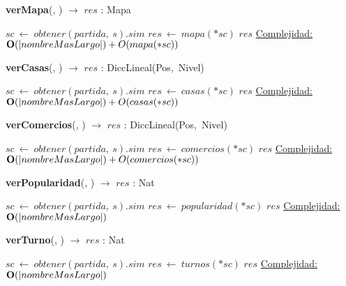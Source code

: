 \begin{Algoritmos}
    \begin{algorithm}[H]{\textbf{verMapa}(, ) $\to$ $res$ : Mapa}
    \begin{algorithmic}[1]
        \State $sc\ \leftarrow\ obtener(partida,\ s).sim$
        \State $res\ \leftarrow\ mapa(*sc)$ 
        \State \Return $res$
        \medskip
        \Statex \underline{Complejidad:} $\bold{O}(|nombreMasLargo|) + O(mapa(*sc))$
    \end{algorithmic}
    \end{algorithm}
      
    \begin{algorithm}[H]{\textbf{verCasas}(, ) $\to$ $res$ : DiccLineal(Pos,\ Nivel)}
    \begin{algorithmic}[1]
        \State $sc\ \leftarrow\ obtener(partida,\ s).sim$
        \State $res\ \leftarrow\ casas(*sc)$
        \State \Return $res$
        \medskip
        \Statex \underline{Complejidad:} $\bold{O}(|nombreMasLargo|) + O(casas(*sc))$
    \end{algorithmic}
    \end{algorithm}

    \begin{algorithm}[H]{\textbf{verComercios}(, ) $\to$ $res$ : DiccLineal(Pos,\ Nivel)}
    \begin{algorithmic}[1]
        \State $sc\ \leftarrow\ obtener(partida,\ s).sim$
        \State $res\ \leftarrow\ comercios(*sc)$
        \State \Return $res$
        \medskip
        \Statex \underline{Complejidad:} $\bold{O}(|nombreMasLargo|) + O(comercios(*sc))$
    \end{algorithmic}
    \end{algorithm}

    \begin{algorithm}[H]{\textbf{verPopularidad}(, ) $\to$ $res$ : Nat}
    \begin{algorithmic}[1]
        \State $sc\ \leftarrow\ obtener(partida,\ s).sim$
        \State $res\ \leftarrow\ popularidad(*sc)$
        \State \Return $res$
        \medskip
        \Statex \underline{Complejidad:} $\bold{O}(|nombreMasLargo|)$
    \end{algorithmic}
    \end{algorithm}

    \begin{algorithm}[H]{\textbf{verTurno}(, ) $\to$ $res$ : Nat}
    \begin{algorithmic}[1]
        \State $sc\ \leftarrow\ obtener(partida,\ s).sim$
        \State $res\ \leftarrow\ turnos(*sc)$
        \State \Return $res$
        \medskip
        \Statex \underline{Complejidad:} $\bold{O}(|nombreMasLargo|)$
    \end{algorithmic}
    \end{algorithm}

\end{Algoritmos}
